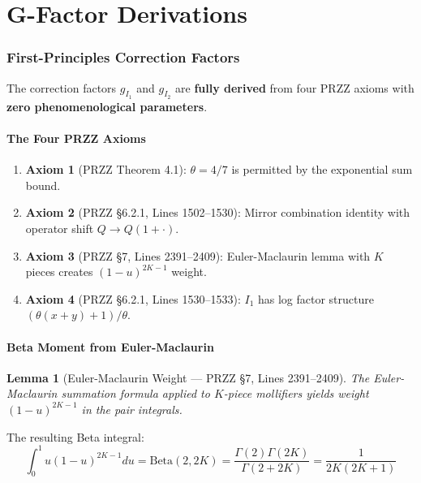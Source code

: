 \documentclass[11pt]{article}
\newtheorem{lemma}{Lemma}
\begin{document}
\part{G-Factor Derivations}

\section{First-Principles Correction Factors}
\label{sec:gfactors}

The correction factors $g_{I_1}$ and $g_{I_2}$ are \textbf{fully derived} from four PRZZ axioms with \textbf{zero phenomenological parameters}.

\subsection{The Four PRZZ Axioms}

\begin{enumerate}
\item \textbf{Axiom 1} (PRZZ Theorem 4.1): $\theta = 4/7$ is permitted by the exponential sum bound.
\item \textbf{Axiom 2} (PRZZ \S6.2.1, Lines 1502--1530): Mirror combination identity with operator shift $Q \to Q(1+\cdot)$.
\item \textbf{Axiom 3} (PRZZ \S7, Lines 2391--2409): Euler-Maclaurin lemma with $K$ pieces creates $(1-u)^{2K-1}$ weight.
\item \textbf{Axiom 4} (PRZZ \S6.2.1, Lines 1530--1533): $I_1$ has log factor structure $(\theta(x+y)+1)/\theta$.
\end{enumerate}

\subsection{Beta Moment from Euler-Maclaurin}

\begin{lemma}[Euler-Maclaurin Weight --- PRZZ \S7, Lines 2391--2409]
The Euler-Maclaurin summation formula applied to $K$-piece mollifiers yields weight $(1-u)^{2K-1}$ in the pair integrals.
\end{lemma}

The resulting Beta integral:
\begin{equation}
\int_0^1 u(1-u)^{2K-1} du = \text{Beta}(2, 2K) = \frac{\Gamma(2)\Gamma(2K)}{\Gamma(2+2K)} = \frac{1}{2K(2K+1)}
\end{equation}
\end{document}
